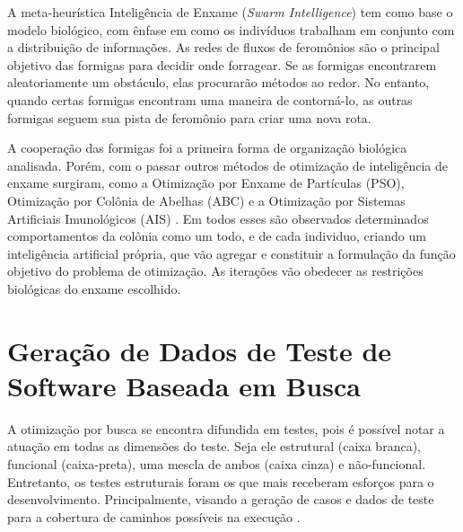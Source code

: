 A meta-heurística Inteligência de Enxame (\textit{Swarm Intelligence}) tem como base o modelo biológico, com ênfase em como os indivíduos trabalham em conjunto com a distribuição de informações. As redes de fluxos de feromônios são o principal objetivo das formigas para decidir onde forragear. Se as formigas encontrarem aleatoriamente um obstáculo, elas procurarão métodos ao redor. No entanto, quando certas formigas encontram uma maneira de contorná-lo, as outras formigas seguem sua pista de feromônio para criar uma nova rota.

A cooperação das formigas foi a primeira forma de organização biológica analisada. Porém, com o passar outros métodos de otimização de inteligência de enxame surgiram, como a Otimização por Enxame de Partículas (PSO), Otimização por Colônia de Abelhas (ABC) e a Otimização por Sistemas Artificiais Imunológicos (AIS) \cite{blum2008swarm}. Em todos esses são observados determinados comportamentos da colônia como um todo, e de cada individuo, criando um inteligência artificial própria, que vão agregar e constituir a formulação da função objetivo do problema de otimização. As iterações vão obedecer as restrições biológicas do enxame escolhido.

\section{Geração de Dados de Teste de Software Baseada em Busca}



A otimização por busca se encontra difundida em testes, pois é possível notar a atuação em todas as dimensões do teste. Seja ele estrutural (caixa branca), funcional (caixa-preta), uma mescla de ambos (caixa cinza) e não-funcional. Entretanto, os testes estruturais foram os que mais receberam esforços para o desenvolvimento. Principalmente, visando a geração de casos e dados de teste para a cobertura de caminhos possíveis na execução \cite{khari2017extensive}. 

